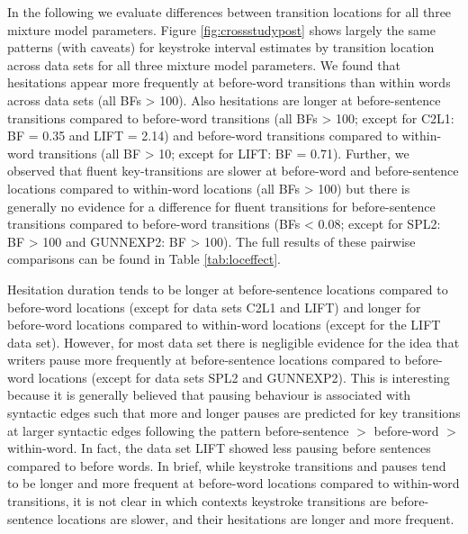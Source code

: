 \begin{appendix}
In the following we evaluate differences between transition locations
for all three mixture model parameters. Figure \ref{fig:crossstudypost}
shows largely the same patterns (with caveats) for keystroke interval
estimates by transition location across data sets for all three mixture
model parameters. We found that hesitations appear more frequently at
before-word transitions than within words across data sets (all BFs
\textgreater{} 100). Also hesitations are longer at before-sentence
transitions compared to before-word transitions (all BFs \textgreater{}
100; except for C2L1: BF = 0.35 and LIFT = 2.14) and before-word
transitions compared to within-word transitions (all BF \textgreater{}
10; except for LIFT: BF = 0.71). Further, we observed that fluent
key-transitions are slower at before-word and before-sentence locations
compared to within-word locations (all BFs \textgreater{} 100) but there
is generally no evidence for a difference for fluent transitions for
before-sentence transitions compared to before-word transitions (BFs
\textless{} 0.08; except for SPL2: BF \textgreater{} 100 and GUNNEXP2:
BF \textgreater{} 100). The full results of these pairwise comparisons
can be found in Table \ref{tab:loceffect}.

Hesitation duration tends to be longer at before-sentence locations
compared to before-word locations (except for data sets C2L1 and LIFT)
and longer for before-word locations compared to within-word locations
(except for the LIFT data set). However, for most data set there is
negligible evidence for the idea that writers pause more frequently at
before-sentence locations compared to before-word locations (except for
data sets SPL2 and GUNNEXP2). This is interesting because it is
generally believed that pausing behaviour is associated with syntactic
edges such that more and longer pauses are predicted for key transitions
at larger syntactic edges following the pattern before-sentence \(>\)
before-word \(>\) within-word. In fact, the data set LIFT showed less
pausing before sentences compared to before words. In brief, while
keystroke transitions and pauses tend to be longer and more frequent at
before-word locations compared to within-word transitions, it is not
clear in which contexts keystroke transitions are before-sentence
locations are slower, and their hesitations are longer and more
frequent.


\end{appendix}
